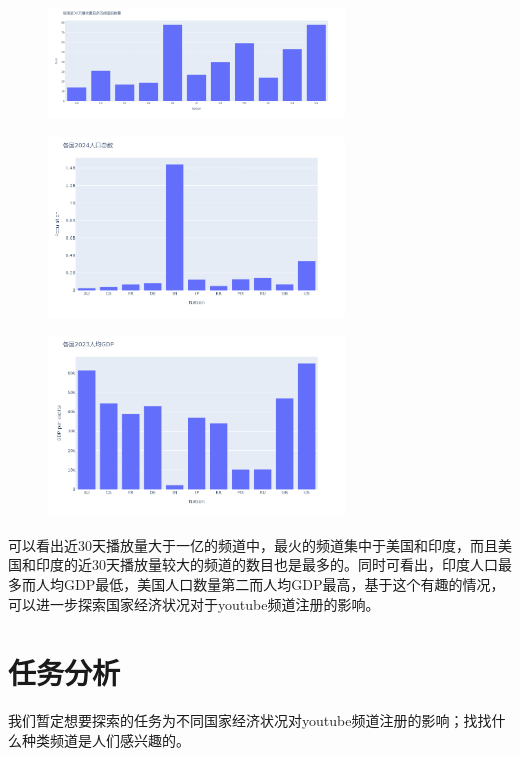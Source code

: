 \documentclass{article}
\begin{document}
\begin{figure}[H] %
\centering %
\includegraphics[width=0.7\textwidth]{pic/p3} %
\label{Fig.p3} %
\end{figure}

\begin{figure}[H] %
\centering %
\includegraphics[width=0.7\textwidth]{pic/p4} %
\label{Fig.p4} %
\end{figure}

\begin{figure}[H] %
\centering %
\includegraphics[width=0.7\textwidth]{pic/p5} %
\label{Fig.p5} %
\end{figure}

可以看出近30天播放量大于一亿的频道中，最火的频道集中于美国和印度，而且美国和印度的近30天播放量较大的频道的数目也是最多的。同时可看出，印度人口最多而人均GDP最低，美国人口数量第二而人均GDP最高，基于这个有趣的情况，可以进一步探索国家经济状况对于youtube频道注册的影响。

\section{任务分析}

我们暂定想要探索的任务为不同国家经济状况对youtube频道注册的影响；找找什么种类频道是人们感兴趣的。
\end{document}
